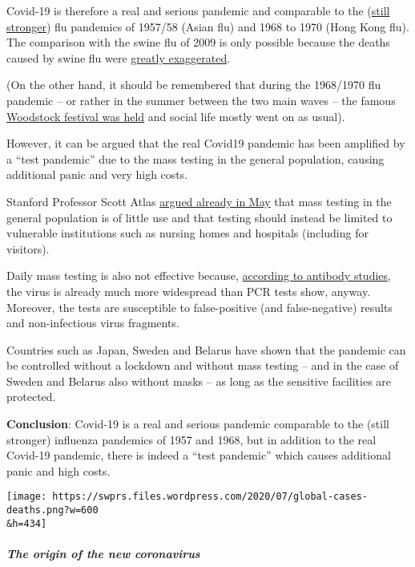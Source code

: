 Covid-19 is therefore a real and serious pandemic and comparable to the
(\href{https://swprs.files.wordpress.com/2020/06/covid-19-comparison-e1592927192181.png}{still
stronger}) flu pandemics of 1957/58 (Asian flu) and 1968 to 1970 (Hong
Kong flu). The comparison with the swine flu of 2009 is only possible
because the deaths caused by swine flu were
\href{https://www.cbsnews.com/news/swine-flu-cases-overestimated/}{greatly
exaggerated}.

(On the other hand, it should be remembered that during the 1968/1970
flu pandemic -- or rather in the summer between the two main waves --
the famous
\href{https://nypost.com/2020/05/16/why-life-went-on-as-normal-during-the-killer-pandemic-of-1969/}{Woodstock
festival was held} and social life mostly went on as usual).

However, it can be argued that the real Covid19 pandemic has been
amplified by a ``test pandemic'' due to the mass testing in the general
population, causing additional panic and very high costs.

Stanford Professor Scott Atlas
\href{https://www.facebook.com/cnn/posts/10160799274796509}{argued
already in May} that mass testing in the general population is of little
use and that testing should instead be limited to vulnerable
institutions such as nursing homes and hospitals (including for
visitors).

Daily mass testing is also not effective because,
\href{https://swprs.org/studies-on-covid-19-lethality/}{according to
antibody studies}, the virus is already much more widespread than PCR
tests show, anyway. Moreover, the tests are susceptible to
false-positive (and false-negative) results and non-infectious virus
fragments.

Countries such as Japan, Sweden and Belarus have shown that the pandemic
can be controlled without a lockdown and without mass testing -- and in
the case of Sweden and Belarus also without masks -- as long as the
sensitive facilities are protected.

\textbf{Conclusion}: Covid-19 is a real and serious pandemic comparable
to the (still stronger) influenza pandemics of 1957 and 1968, but in
addition to the real Covid-19 pandemic, there is indeed a ``test
pandemic'' which causes additional panic and high costs.

\texttt{[image: https://swprs.files.wordpress.com/2020/07/global-cases-deaths.png?w=600\\\&h=434]}

\hypertarget{the-origin-of-the-new-coronavirus}{%
\subparagraph{\texorpdfstring{\textbf{The origin of the new
coronavirus}}{The origin of the new coronavirus}}\label{the-origin-of-the-new-coronavirus}}

